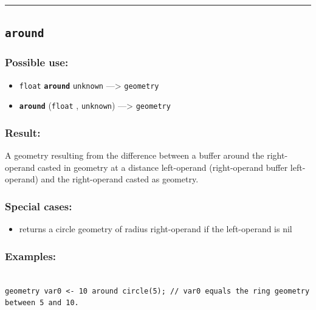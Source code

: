 \documentclass[]{book}
\providecommand{\tightlist}{%
  \setlength{\itemsep}{0pt}\setlength{\parskip}{0pt}}
\theoremstyle{definition}
\theoremstyle{definition}
\theoremstyle{definition}
\theoremstyle{remark}
\begin{document}
\begin{center}\rule{0.5\linewidth}{\linethickness}\end{center}

\subsection{\texorpdfstring{\texttt{around}}{around}}\label{around}

\subsubsection{Possible use:}\label{possible-use-42}

\begin{itemize}
\tightlist
\item
  \texttt{float} \textbf{\texttt{around}} \texttt{unknown}
  ---\textgreater{} \texttt{geometry}
\item
  \textbf{\texttt{around}} (\texttt{float} , \texttt{unknown})
  ---\textgreater{} \texttt{geometry}
\end{itemize}

\subsubsection{Result:}\label{result-41}

A geometry resulting from the difference between a buffer around the
right-operand casted in geometry at a distance left-operand
(right-operand buffer left-operand) and the right-operand casted as
geometry.

\subsubsection{Special cases:}\label{special-cases-17}

\begin{itemize}
\tightlist
\item
  returns a circle geometry of radius right-operand if the left-operand
  is nil
\end{itemize}

\subsubsection{Examples:}\label{examples-34}

\begin{verbatim}
 
geometry var0 <- 10 around circle(5); // var0 equals the ring geometry between 5 and 10.
\end{verbatim}
\end{document}
